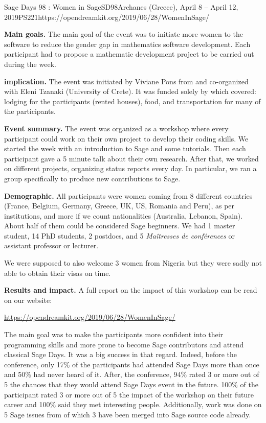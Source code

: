 \begin{event}{Sage Days 98 : Women in Sage}{SD98}{Archanes (Greece), April 8 -- April 12, 2019}{PS}{22}{1}{https://opendreamkit.org/2019/06/28/WomenInSage/}

\textbf{Main goals.} The main goal of the event was to initiate more women to the software \Sage to reduce the gender gap in mathematics software
development. Each participant had to propose a mathematic development project to be carried out during the week.

\textbf{\ODK implication.} The event was initiated by Viviane Pons from \ODK and co-organized with Eleni Tzanaki (University of Crete). It was funded solely by \ODK which covered: lodging for the participants (rented houses), food, and transportation for many of the participants.

\textbf{Event summary.} The event was organized as a workshop where every participant could work on their own project to develop their coding skills. We started the week with an introduction to Sage and some tutorials. Then each participant gave a 5 minute talk about their own research. After that, we worked on different projects, organizing status reports every day. In particular, we ran a group specifically to produce new contributions to Sage.

\textbf{Demographic.} All participants were women coming from 8 different countries (France, Belgium, Germany, Greece, UK, US, Romania and Peru), as per institutions, and more if we count nationalities (Australia, Lebanon, Spain). About half of them could be considered Sage beginners. We had 1 master student, 14 PhD students, 2 postdocs, and 5 \textit{Maîtresses de conférences} or assistant professor or lecturer.

We were supposed to also welcome 3 women from Nigeria but they were sadly not able to obtain their visas on time.

\textbf{Results and impact.} A full report on the impact of this
workshop can be read on our website:
\centerline{\url{https://opendreamkit.org/2019/06/28/WomenInSage/}}
The main goal was to make the participants more confident into their programming skills and more prone to become Sage contributors and attend classical Sage Days. It was a big success in that regard. Indeed, before the conference, only 17\% of the participants had attended Sage Days more than once and 50\% had never heard of it. After, the conference, 94\% rated 3 or more out of 5 the chances that they would attend Sage Days event in the future. 100\% of the participant rated 3 or more out of 5 the impact of the workshop on their future career and 100\% said they met interesting people. Additionally, work was done on 5 Sage issues from of which 3 have been merged into Sage source code already.


\end{event}
